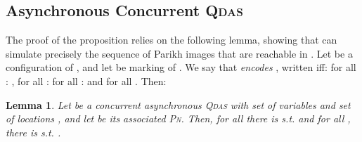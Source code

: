 \documentclass[runningheads,oribibl,]{article}
\newcommand{\pn}{\textsc{Pn}\xspace}
\newcommand{\qdas}{\textsc{Qdas}\xspace}
\newtheorem{lemma}{Lemma}{}
\begin{document}
\subsection{Asynchronous Concurrent \qdas}


\propfromqdastopn*

The proof of the proposition relies on the following lemma, showing
that  can simulate precisely the sequence of Parikh images that
are reachable in . Let  be a configuration of ,
and let  be marking of . We say that \emph{ encodes
  }, written  iff:  for all
: ,  for all : for all
:  and  for all  . Then:

\begin{lemma}\label{lemma:from-qdas-to-pn}
  Let  be a concurrent asynchronous \qdas with set of variables
   and set of locations , and let  be its associated
  \pn.  Then, for all  there is
   s.t.  and for all
  , there is  s.t. .
\end{lemma}
\end{document}
